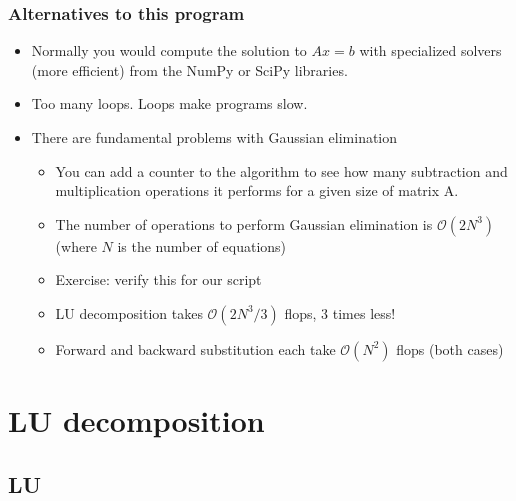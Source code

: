 \begin{frame}[fragile]
  \frametitle{Alternatives to this program}
  \begin{itemize}
    \item Normally you would compute the solution to $Ax=b$ with specialized solvers (more efficient) from the NumPy or SciPy libraries.
    \item Too many loops. Loops make programs slow.
    \item There are fundamental problems with Gaussian elimination\pause
    \begin{itemize}
      \item You can add a counter to the algorithm to see how many subtraction and multiplication operations it performs for a given size of matrix A.
      \item The number of operations to perform Gaussian elimination is $\mathcal{O}(2N^3)$ (where $N$ is the number of equations) 
      \item Exercise: verify this for our script \pause
      \item LU decomposition takes $\mathcal{O}(2N^3/3)$ flops, 3 times less!
      \item Forward and backward substitution each take $\mathcal{O}(N^2)$
flops (both cases) 
    \end{itemize}
  \end{itemize}
\end{frame}

\section{LU decomposition}
\subsection*{LU}

